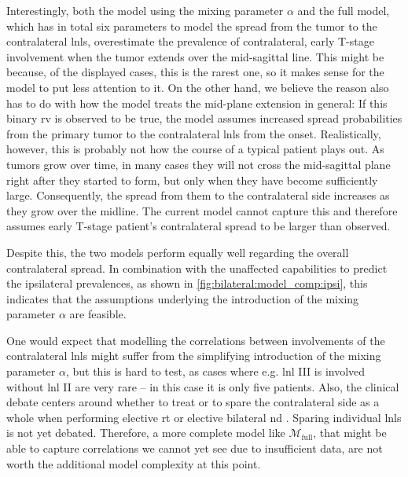 \documentclass[\relativeRoot/main.tex]{subfiles}
\begin{document}
Interestingly, both the model using the mixing parameter $\alpha$ and the full model, which has in total six parameters to model the spread from the tumor to the contralateral \glspl{lnl}, overestimate the prevalence of contralateral, early T-stage involvement when the tumor extends over the mid-sagittal line. This might be because, of the displayed cases, this is the rarest one, so it makes sense for the model to put less attention to it. On the other hand, we believe the reason also has to do with how the model treats the mid-plane extension in general: If this binary \gls{rv} is observed to be true, the model assumes increased spread probabilities from the primary tumor to the contralateral \glspl{lnl} from the onset. Realistically, however, this is probably not how the course of a typical patient plays out. As tumors grow over time, in many cases they will not cross the mid-sagittal plane right after they started to form, but only when they have become sufficiently large. Consequently, the spread from them to the contralateral side increases as they grow over the midline. The current model cannot capture this and therefore assumes early T-stage patient's contralateral spread to be larger than observed.

Despite this, the two models perform equally well regarding the overall contralateral spread. In combination with the unaffected capabilities to predict the ipsilateral prevalences, as shown in \cref{fig:bilateral:model_comp:ipsi}, this indicates that the assumptions underlying the introduction of the mixing parameter $\alpha$ are feasible.

One would expect that modelling the correlations between involvements of the contralateral \glspl{lnl} might suffer from the simplifying introduction of the mixing parameter $\alpha$, but this is hard to test, as cases where e.g. \gls{lnl} III is involved without \gls{lnl} II are very rare -- in this case it is only five patients. Also, the clinical debate centers around whether to treat or to spare the contralateral side as a whole when performing elective \gls{rt} or elective bilateral \gls{nd} \cite{biau_selection_2019,al-mamgani_contralateral_2017}. Sparing individual \glspl{lnl} is not yet debated. Therefore, a more complete model like $\mathcal{M}_\text{full}$, that might be able to capture correlations we cannot yet see due to insufficient data, are not worth the additional model complexity at this point.
\end{document}
